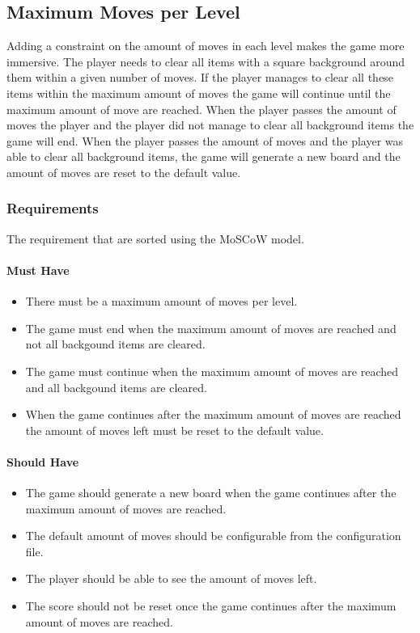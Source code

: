 \documentclass{article}
\begin{document}
\subsection{Maximum Moves per Level}
Adding a constraint on the amount of moves in each level makes the game more immersive. The player needs to clear all items with a square background around them within a given number of moves. If the player manages to clear all these items within the maximum amount of moves the game will continue until the maximum amount of move are reached. When the player passes the amount of moves the player and the player did not manage to clear all background items the game will end. When the player passes the amount of moves and the player was able to clear all background items, the game will generate a new board and the amount of moves are reset to the default value. 

\subsubsection{Requirements}
The requirement that are sorted using the MoSCoW model.

\paragraph{Must Have}
\begin{itemize}
	\item There must be a maximum amount of moves per level.
	\item The game must end when the maximum amount of moves are reached and not all backgound items are cleared.
	\item The game must continue when the maximum amount of moves are reached and all backgound items are cleared.
	\item When the game continues after the maximum amount of moves are reached the amount of moves left must be reset to the default value.
\end{itemize}
\paragraph{Should Have}
\begin{itemize}
	\item The game should generate a new board when the game continues after the maximum amount of moves are reached.
	\item The default amount of moves should be configurable from the configuration file.
	\item The player should be able to see the amount of moves left.
	\item The score should not be reset once the game continues after the maximum amount of moves are reached.
\end{itemize}
\end{document}
